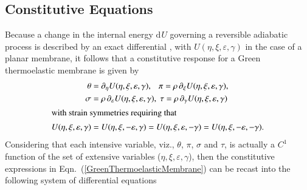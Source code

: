 \subsection{Constitutive Equations}

Because a change in the internal energy $\mathrm{d} \hspace{1pt} U$ governing a reversible adiabatic process is described by an exact differential \cite{Caratheodory09}, with $U( \eta, \xi, \varepsilon, \gamma )$ in the case of a planar membrane, it follows that a constitutive response for a Green thermo\-elastic membrane is given by
\begin{subequations}
    \label{GreenThermoelasticity}
    \begin{align}
    \theta & = \partial_{\eta} U(\eta, \xi, \varepsilon, \gamma) , \;
    \phantom{\rho}
    \pi = \rho \, \partial_{\xi} U(\eta, \xi, \varepsilon, \gamma) ,
    \notag \\
    \sigma & = \rho \, \partial_{\varepsilon} U(\eta, \xi, \varepsilon, \gamma) , \;
    \tau = \rho \, \partial_{\gamma} U(\eta, \xi, \varepsilon, \gamma)
    \label{GreenThermoelasticMembrane} \\
    \intertext{with strain symmetries requiring that}
    U(\eta, \xi, \varepsilon, \gamma) & =
    U(\eta, \xi, -\varepsilon, \gamma) = 
    U(\eta, \xi, \varepsilon, -\gamma) = 
    U(\eta, \xi, -\varepsilon, -\gamma) .
    \label{internalEnergyInveriance}
    \end{align}
\end{subequations}
Considering that each intensive variable, viz., $\theta$, $\pi$, $\sigma$ and $\tau$, is actually a $C^1$ function of the set of extensive variables ($\eta , \xi , \varepsilon , \gamma$), then the constitutive expressions in Eqn.~(\ref{GreenThermoelasticMembrane}) can be recast into the following system of differential equations
